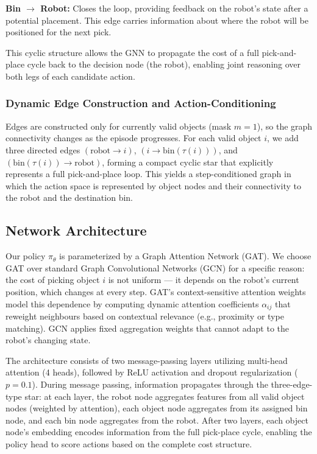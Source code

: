 \documentclass[conference]{IEEEtran}
\begin{document}
\textbf{Bin $\to$ Robot:} Closes the loop, providing feedback on the robot's state after a potential placement. This edge carries information about where the robot will be positioned for the next pick.

This cyclic structure allows the GNN to propagate the cost of a full pick-and-place cycle back to the decision node (the robot), enabling joint reasoning over both legs of each candidate action.

\subsubsection{Dynamic Edge Construction and Action-Conditioning}
Edges are constructed only for currently valid objects (mask $m=1$), so the graph connectivity changes as the episode progresses.
For each valid object $i$, we add three directed edges $(\text{robot}\rightarrow i)$, $(i \rightarrow \text{bin}(\tau(i)))$, and $(\text{bin}(\tau(i)) \rightarrow \text{robot})$, forming a compact cyclic star that explicitly represents a full pick-and-place loop.
This yields a step-conditioned graph in which the action space is represented by object nodes and their connectivity to the robot and the destination bin.

\subsection{Network Architecture}
Our policy $\pi_\theta$ is parameterized by a Graph Attention Network (GAT). We choose GAT over standard Graph Convolutional Networks (GCN) for a specific reason: the cost of picking object $i$ is not uniform --- it depends on the robot's current position, which changes at every step. GAT's context-sensitive attention weights model this dependence by computing dynamic attention coefficients $\alpha_{ij}$ that reweight neighbours based on contextual relevance (e.g., proximity or type matching). GCN applies fixed aggregation weights that cannot adapt to the robot's changing state.

The architecture consists of two message-passing layers utilizing multi-head attention (4 heads), followed by ReLU activation and dropout regularization ($p=0.1$). During message passing, information propagates through the three-edge-type star: at each layer, the robot node aggregates features from all valid object nodes (weighted by attention), each object node aggregates from its assigned bin node, and each bin node aggregates from the robot. After two layers, each object node's embedding encodes information from the full pick-place cycle, enabling the policy head to score actions based on the complete cost structure.
\end{document}
